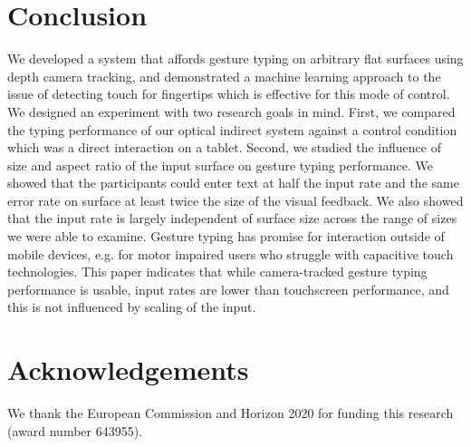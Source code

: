 \documentclass{chi-ext}
\begin{document}
\section{Conclusion}
We developed a system that affords gesture typing on arbitrary flat surfaces using depth camera tracking, and demonstrated a machine learning approach to the issue of detecting touch for fingertips which is effective for this mode of control. We designed an experiment with two research goals in mind. First, we compared the typing performance of our optical indirect system against a control condition which was a direct interaction on a tablet. Second, we studied the influence of size and aspect ratio of the input surface on gesture typing performance. We showed that the participants could enter text at half the input rate and the same error rate on surface at least twice the size of the visual feedback. We also showed that the input rate is largely independent of surface size across the range of sizes we were able to examine. Gesture typing has promise for interaction outside of mobile devices, e.g. for motor impaired users who struggle with capacitive touch technologies. This paper indicates that while camera-tracked gesture typing performance is usable, input rates are lower than touchscreen performance, and this is not influenced by scaling of the input.

\section{Acknowledgements}
We thank the European Commission and Horizon 2020 for funding this research (award number 643955).

\balance


\end{document}
